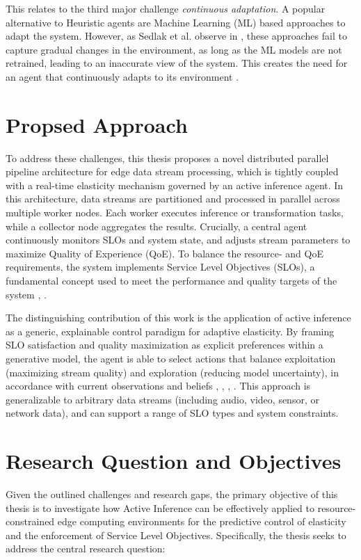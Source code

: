 This relates to the third major challenge \textit{continuous adaptation}\cite{danilenka_adaptive_2025}. A popular alternative to Heuristic agents are Machine Learning (ML) based approaches to adapt the system. However, as Sedlak et al. observe in \cite{sedlak_active_2024}, these approaches fail to capture gradual changes in the environment, as long as the ML models are not retrained, leading to an inaccurate view of the system. This creates the need for an agent that continuously adapts to its environment \cite{sedlak_equilibrium_2024}.

\section{Propsed Approach}
To address these challenges, this thesis proposes a novel distributed parallel pipeline
architecture for edge data stream processing, which is tightly coupled with a real-time elasticity
mechanism governed by an active inference agent. In this architecture, data streams are
partitioned and processed in parallel across multiple worker nodes. Each worker executes
inference or transformation tasks, while a collector node aggregates the results. Crucially, a
central agent continuously monitors SLOs and system state, and adjusts stream parameters to maximize Quality of Experience (QoE). To balance the resource- and QoE requirements, the system implements Service Level Objectives (SLOs), a fundamental concept used to meet the performance and quality targets of the system \cite{sedlak_towards_2025}, \cite{nastic_sloc_2020}.

The distinguishing contribution of this work is the application of active inference as a generic,
explainable control paradigm for adaptive elasticity. By framing SLO satisfaction and quality maximization as explicit preferences within a generative model, the agent is able to select actions that balance exploitation (maximizing stream quality) and exploration (reducing model uncertainty), in accordance with current observations and beliefs \cite{lanillos_active_2021}, \cite{danilenka_adaptive_2025}, \cite{casamayor_pujol_deepslos_2024}, \cite{sedlak_adaptive_2024}. This approach is generalizable to arbitrary data streams (including audio, video, sensor, or network
data), and can support a range of SLO types and system constraints.

\section{Research Question and Objectives}
Given the outlined challenges and research gaps, the primary objective of this thesis is to
investigate how Active Inference can be effectively applied to resource-constrained edge
computing environments for the predictive control of elasticity and the enforcement of
Service Level Objectives. Specifically, the thesis seeks to address the central research question:

